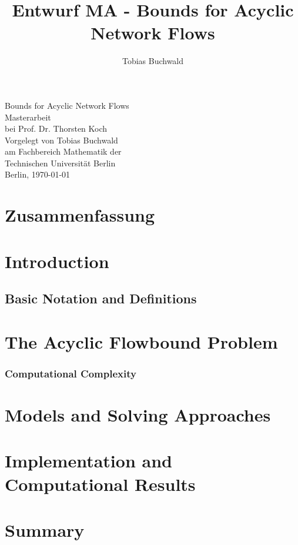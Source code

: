\documentclass[a4paper]{article}
\theoremstyle{definition}
\theoremstyle{Tobi}
\begin{document}
\title{Entwurf MA - Bounds for Acyclic Network Flows}

\author{Tobias Buchwald}



\begin{center} 

\Huge{Bounds for Acyclic Network Flows}\\ \vspace{12 cm}
\Large{Masterarbeit\\ bei Prof. Dr. Thorsten Koch}\\ \vspace{1cm}
\large{Vorgelegt von Tobias Buchwald}\\
\large{am Fachbereich Mathematik der \\Technischen Universit\"at Berlin}\\
\vspace{2cm}
\large{Berlin,  \today}

\end{center} 



\newpage

\tableofcontents
\newpage
\section*{Zusammenfassung}
\newpage
\section{Introduction} 
\newpage
% 
\subsection{Basic Notation and Definitions}
\newpage
\section{The Acyclic Flowbound Problem}
\subsubsection{Computational Complexity}
\newpage
\section{Models and Solving Approaches}
\newpage
\section{Implementation and Computational Results}
\newpage
\section{Summary}




\newpage
\newpage
{}

% 

\nocite{*}
\end{document}
